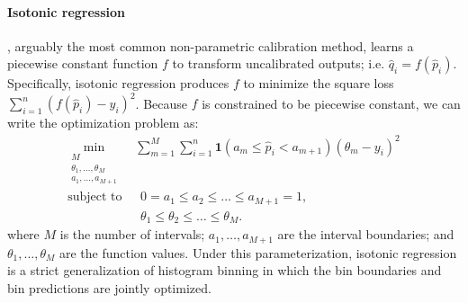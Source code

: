 \paragraph{Isotonic regression} \cite{zadrozny2002transforming}, arguably the most common non-parametric calibration method,
learns a piecewise constant function $f$ to transform uncalibrated outputs; i.e. $\hat q_i = f(\hat p_i)$.
Specifically, isotonic regression produces $f$ to minimize the square loss $\sum_{i=1}^n (f(\hat p_i) - y_i)^2$.
Because $f$ is constrained to be piecewise constant, we can write the optimization problem as:
%
\begin{equation}
\begin{aligned}
\label{iso_eq}
\min_{\substack{M \\ \theta_1,\ldots,\theta_M \\ a_1,\ldots,a_{M+1}}} & \hspace{3pt} \sum_{m=1}^M \sum_{i = 1}^n
\mathbf{1} (a_m \leq \hat p_i < a_{m+1}) \left(\theta_m - y_i \right)^2 \\
\text{subject to} & \hspace{8pt} 0 = a_1 \leq a_2 \leq \ldots \leq a_{M+1} = 1, \nonumber \\
& \hspace{8pt} \theta_1 \leq \theta_2 \leq \ldots \leq \theta_M. \nonumber
\end{aligned}
\end{equation}
%
where $M$ is the number of intervals; $a_1, \ldots, a_{M+1}$ are the interval boundaries; and $\theta_1, \ldots, \theta_M$ are the function values.
Under this parameterization, isotonic regression is a strict generalization of histogram binning in which the bin boundaries and bin predictions are jointly optimized.

%
%

